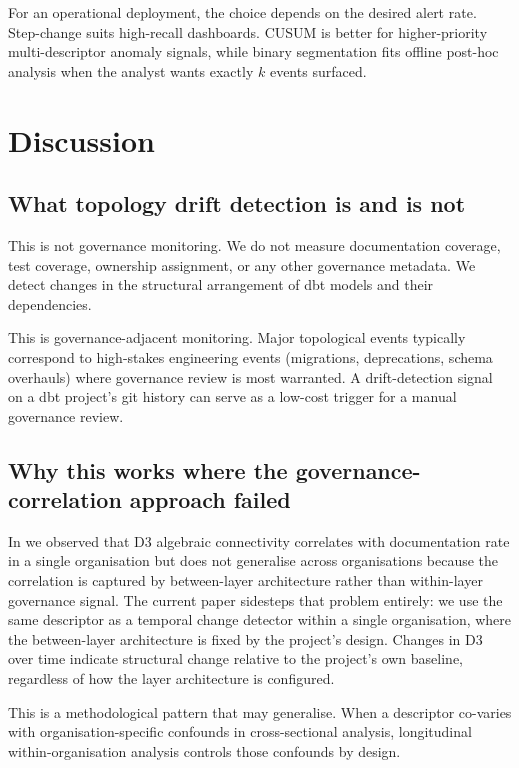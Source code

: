 \documentclass[11pt,a4paper]{article}
\begin{document}
For an operational deployment, the choice depends on the desired
alert rate. Step-change suits high-recall dashboards. CUSUM is better
for higher-priority multi-descriptor anomaly signals, while binary
segmentation fits offline post-hoc analysis when the analyst wants
exactly $k$ events surfaced.

\section{Discussion}

\subsection{What topology drift detection is and is not}

This is not governance monitoring. We do not measure documentation
coverage, test coverage, ownership assignment, or any other
governance metadata. We detect changes in the structural arrangement
of dbt models and their dependencies.

This is governance-adjacent monitoring. Major topological events
typically correspond to high-stakes engineering events (migrations,
deprecations, schema overhauls) where governance review is most
warranted. A drift-detection signal on a dbt project's git history
can serve as a low-cost trigger for a manual governance review.

\subsection{Why this works where the governance-correlation approach failed}

In \citep{hari2026descriptors} we observed that D3 algebraic
connectivity correlates with documentation rate in a single
organisation but does not generalise across organisations because the
correlation is captured by between-layer architecture rather than
within-layer governance signal. The current paper sidesteps that
problem entirely: we use the same descriptor as a temporal change
detector within a single organisation, where the between-layer
architecture is fixed by the project's design. Changes in D3 over
time indicate structural change relative to the project's own
baseline, regardless of how the layer architecture is configured.

This is a methodological pattern that may generalise. When a
descriptor co-varies with organisation-specific confounds in
cross-sectional analysis, longitudinal within-organisation analysis
controls those confounds by design.
\end{document}
